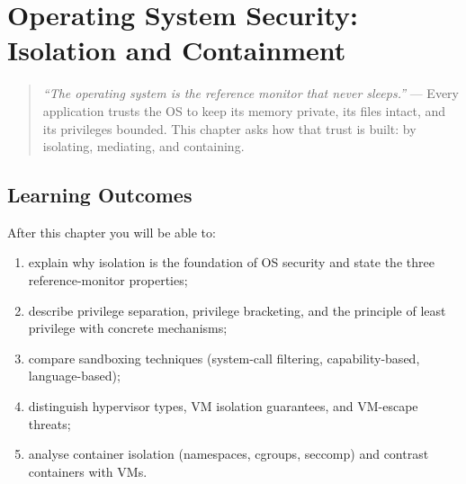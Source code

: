 \chapter{Operating System Security: Isolation and Containment}
\label{ch:os}
\begin{quote}
\emph{``The operating system is the reference monitor that never sleeps.''} --- Every application trusts the OS to keep its memory private, its files intact, and its privileges bounded. This chapter asks how that trust is built: by isolating, mediating, and containing.
\end{quote}
\noindent{}
\vspace{0.4em}
\section*{Learning Outcomes}
After this chapter you will be able to:
\begin{enumerate}[label=(L\arabic*)]
    \item explain why isolation is the foundation of OS security and state the three reference-monitor properties;
    \item describe privilege separation, privilege bracketing, and the principle of least privilege with concrete mechanisms;
    \item compare sandboxing techniques (system-call filtering, capability-based, language-based);
    \item distinguish hypervisor types, VM isolation guarantees, and VM-escape threats;
    \item analyse container isolation (namespaces, cgroups, seccomp) and contrast containers with VMs.
\end{enumerate}
